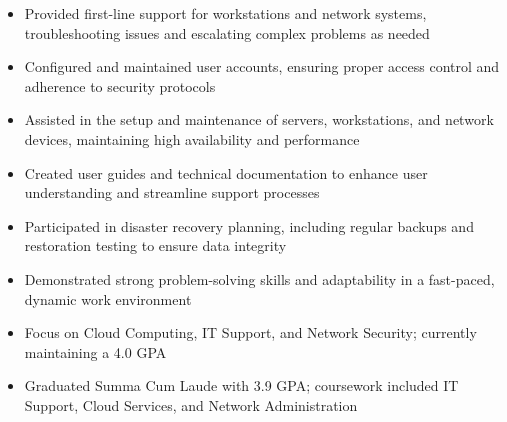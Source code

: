\par\smallskip
\noindent
\begin{minipage}{20cm}
  \begin{minipage}{9.75cm}
    \begin{itemize}
      \item Provided first-line support for workstations and network systems, troubleshooting issues and escalating complex problems as needed
      \item Configured and maintained user accounts, ensuring proper access control and adherence to security protocols
      \item Assisted in the setup and maintenance of servers, workstations, and network devices, maintaining high availability and performance
    \end{itemize}
  \end{minipage}
  \hfill
  \begin{minipage}{9.75cm}
    \begin{itemize}
      \item Created user guides and technical documentation to enhance user understanding and streamline support processes
      \item Participated in disaster recovery planning, including regular backups and restoration testing to ensure data integrity
      \item Demonstrated strong problem-solving skills and adaptability in a fast-paced, dynamic work environment
    \end{itemize}
  \end{minipage}
\end{minipage}

\begin{itemize}
  \item Focus on Cloud Computing, IT Support, and Network Security; currently maintaining a 4.0 GPA
\end{itemize}
\divider

\begin{itemize}
  \item Graduated Summa Cum Laude with 3.9 GPA; coursework included IT Support, Cloud Services, and Network Administration
\end{itemize}

\noindent
\begin{minipage}{20cm}
     
     
     
\end{minipage}


